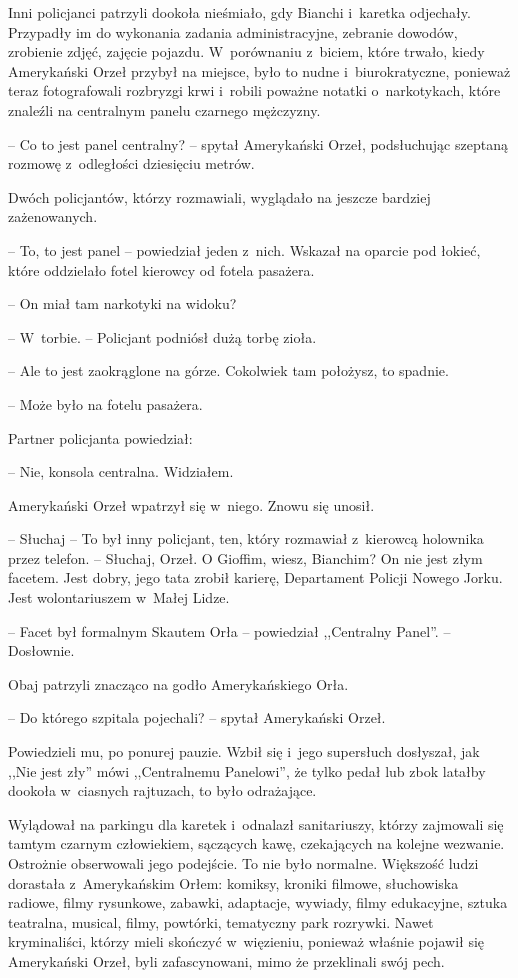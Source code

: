 \documentclass[oneside,polish,11pt,sfheadings]{mwbk}
\begin{document}
Inni policjanci patrzyli dookoła nieśmiało, gdy Bianchi i~karetka
odjechały. Przypadły im do wykonania zadania administracyjne, zebranie
dowodów, zrobienie zdjęć, zajęcie pojazdu. W~porównaniu z~biciem, które
trwało, kiedy Amerykański Orzeł przybył na miejsce, było to nudne i~biurokratyczne, ponieważ teraz fotografowali rozbryzgi krwi i~robili
poważne notatki o~narkotykach, które znaleźli na centralnym panelu
czarnego mężczyzny.

-- Co to jest panel centralny? -- spytał Amerykański Orzeł, podsłuchując
szeptaną rozmowę z~odległości dziesięciu metrów.

Dwóch policjantów, którzy rozmawiali, wyglądało na jeszcze bardziej
zażenowanych. 

-- To, to jest panel -- powiedział jeden z~nich. Wskazał na
oparcie pod łokieć, które oddzielało fotel kierowcy od fotela pasażera.

-- On miał tam narkotyki na widoku?

-- W~torbie. -- Policjant podniósł dużą torbę zioła.

-- Ale to jest zaokrąglone na górze. Cokolwiek tam położysz, to spadnie.

-- Może było na fotelu pasażera.

Partner policjanta powiedział: 

-- Nie, konsola centralna. Widziałem.

Amerykański Orzeł wpatrzył się w~niego. Znowu się unosił.

-- Słuchaj -- To był inny policjant, ten, który rozmawiał z~kierowcą
holownika przez telefon. -- Słuchaj, Orzeł. O Gioffim, wiesz, Bianchim?
On nie jest złym facetem. Jest dobry, jego tata zrobił karierę,
Departament Policji Nowego Jorku. Jest wolontariuszem w~Małej Lidze.

-- Facet był formalnym Skautem Orła -- powiedział ,,Centralny Panel''. -- Dosłownie.

Obaj patrzyli znacząco na godło Amerykańskiego Orła.

-- Do którego szpitala pojechali? -- spytał Amerykański Orzeł.

Powiedzieli mu, po ponurej pauzie. Wzbił się i~jego supersłuch
dosłyszał, jak ,,Nie jest zły'' mówi ,,Centralnemu Panelowi'', że tylko
pedał lub zbok latałby dookoła w~ciasnych rajtuzach, to było odrażające.

Wylądował na parkingu dla karetek i~odnalazł sanitariuszy, którzy
zajmowali się tamtym czarnym człowiekiem, sączących kawę, czekających na
kolejne wezwanie. Ostrożnie obserwowali jego podejście. To nie było
normalne. Większość ludzi dorastała z~Amerykańskim Orłem: komiksy,
kroniki filmowe, słuchowiska radiowe, filmy rysunkowe, zabawki,
adaptacje, wywiady, filmy edukacyjne, sztuka teatralna, musical, filmy,
powtórki, tematyczny park rozrywki. Nawet kryminaliści, którzy mieli
skończyć w~więzieniu, ponieważ właśnie pojawił się Amerykański Orzeł,
byli zafascynowani, mimo że przeklinali swój pech.
\end{document}
